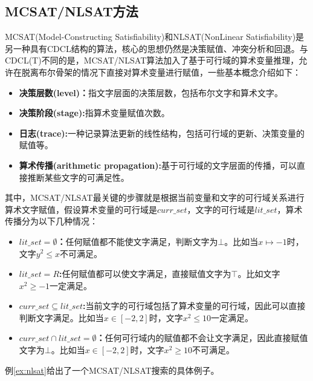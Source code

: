 \subsection{MCSAT/NLSAT方法}
MCSAT(Model-Constructing Satisfiability)和NLSAT(NonLinear Satisfiability)是另一种具有CDCL结构的算法，核心的思想仍然是决策赋值、冲突分析和回退。与CDCL(T)不同的是，MCSAT/NLSAT算法加入了基于可行域的算术变量推理，允许在脱离布尔骨架的情况下直接对算术变量进行赋值，一些基本概念介绍如下：
\begin{itemize}
    \item \textbf{决策层数(level)：}指文字层面的决策层数，包括布尔文字和算术文字。
    \item \textbf{决策阶段(stage):}指算术变量赋值次数。
    \item \textbf{日志(trace):}一种记录算法更新的线性结构，包括可行域的更新、决策变量的赋值等。
    \item \textbf{算术传播(arithmetic propagation):}基于可行域的文字层面的传播，可以直接推断某些文字的可满足性。
\end{itemize}
其中，MCSAT/NLSAT最关键的步骤就是根据当前变量和文字的可行域关系进行算术文字赋值，假设算术变量的可行域是$curr\_set$，文字的可行域是$lit\_set$，算术传播分为以下几种情况：
\begin{itemize}
    \item \textbf{$lit\_set = \emptyset$：}任何赋值都不能使文字满足，判断文字为$\bot$。比如当$x \mapsto -1$时，文字$y^2 \leq x$不可满足。
    \item \textbf{$lit\_set = R$:}任何赋值都可以使文字满足，直接赋值文字为$\top$。比如文字$x^2 \geq -1$一定满足。
    \item \textbf{$curr\_set \subseteq lit\_set$:}当前文字的可行域包括了算术变量的可行域，因此可以直接判断文字满足。比如当$x \in [-2, 2]$时，文字$x^2 \leq 10$一定满足。
    \item \textbf{$curr\_set \cap lit\_set = \emptyset$：}任何可行域内的赋值都不会让文字满足，因此直接赋值文字为$\bot$。比如当$x \in [-2, 2]$时，文字$x^2 \geq 10$不可满足。
\end{itemize}

例\ref{ex:nlsat}给出了一个MCSAT/NLSAT搜索的具体例子。

